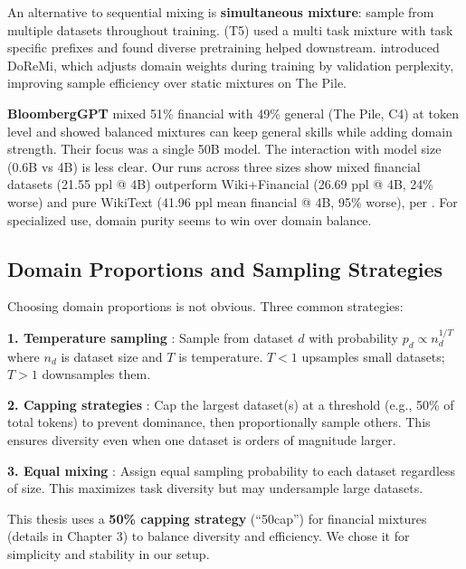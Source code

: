 An alternative to sequential mixing is \textbf{simultaneous mixture}: sample from multiple datasets throughout training. \textcite{raffel2020exploring} (T5) used a multi task mixture with task specific prefixes and found diverse pretraining helped downstream. \textcite{xie2023doremi} introduced DoReMi, which adjusts domain weights during training by validation perplexity, improving sample efficiency over static mixtures on The Pile.

\textbf{BloombergGPT} \parencite{wu2023bloomberggpt} mixed 51\% financial with 49\% general (The Pile, C4) at token level and showed balanced mixtures can keep general skills while adding domain strength. Their focus was a single 50B model. The interaction with model size (0.6B vs 4B) is less clear. Our runs across three sizes show mixed financial datasets (21.55 ppl @ 4B) outperform Wiki+Financial (26.69 ppl @ 4B, 24\% worse) and pure WikiText (41.96 ppl mean financial @ 4B, 95\% worse), per . For specialized use, domain purity seems to win over domain balance.

\subsection{Domain Proportions and Sampling Strategies}

Choosing domain proportions is not obvious. Three common strategies:

\textbf{1. Temperature sampling} \parencite{arivazhagan2019massively}: Sample from dataset $d$ with probability $p_d \propto n_d^{1/T}$ where $n_d$ is dataset size and $T$ is temperature. $T < 1$ upsamples small datasets; $T > 1$ downsamples them.

\textbf{2. Capping strategies} \parencite{longpre2023pretrainer}: Cap the largest dataset(s) at a threshold (e.g., 50\% of total tokens) to prevent dominance, then proportionally sample others. This ensures diversity even when one dataset is orders of magnitude larger.

\textbf{3. Equal mixing} \parencite{sanh2022multitask}: Assign equal sampling probability to each dataset regardless of size. This maximizes task diversity but may undersample large datasets.

This thesis uses a \textbf{50\% capping strategy} (``50cap'') for financial mixtures (details in Chapter 3) to balance diversity and efficiency. We chose it for simplicity and stability in our setup.

